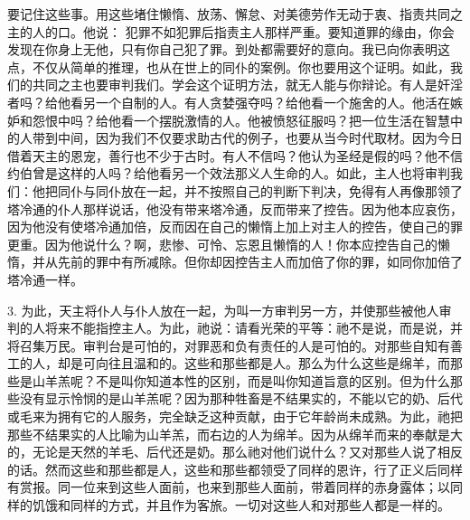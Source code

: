 要记住这些事。用这些堵住懒惰、放荡、懈怠、对美德劳作无动于衷、指责共同之主的人的口。他说： 犯罪不如犯罪后指责主人那样严重。要知道罪的缘由，你会发现在你身上无他，只有你自己犯了罪。到处都需要好的意向。我已向你表明这点，不仅从简单的推理，也从在世上的同仆的案例。你也要用这个证明。如此，我们的共同之主也要审判我们。学会这个证明方法，就无人能与你辩论。有人是奸淫者吗？给他看另一个自制的人。有人贪婪强夺吗？给他看一个施舍的人。他活在嫉妒和怨恨中吗？给他看一个摆脱激情的人。他被愤怒征服吗？把一位生活在智慧中的人带到中间，因为我们不仅要求助古代的例子，也要从当今时代取材。因为今日借着天主的恩宠，善行也不少于古时。有人不信吗？他认为圣经是假的吗？他不信约伯曾是这样的人吗？给他看另一个效法那义人生命的人。如此，主人也将审判我们：他把同仆与同仆放在一起，并不按照自己的判断下判决，免得有人再像那领了塔冷通的仆人那样说话，他没有带来塔冷通，反而带来了控告。因为他本应哀伤，因为他没有使塔冷通加倍，反而因在自己的懒惰上加上对主人的控告，使自己的罪更重。因为他说什么？啊，悲惨、可怜、忘恩且懒惰的人！你本应控告自己的懒惰，并从先前的罪中有所减除。但你却因控告主人而加倍了你的罪，如同你加倍了塔冷通一样。\par

3. 为此，天主将仆人与仆人放在一起，为叫一方审判另一方，并使那些被他人审判的人将来不能指控主人。为此，祂说：请看光荣的平等：祂不是说，而是说，并将召集万民。审判台是可怕的，对罪恶和负有责任的人是可怕的。对那些自知有善工的人，却是可向往且温和的。这些和那些都是人。那么为什么这些是绵羊，而那些是山羊羔呢？不是叫你知道本性的区别，而是叫你知道旨意的区别。但为什么那些没有显示怜悯的是山羊羔呢？因为那种牲畜是不结果实的，不能以它的奶、后代或毛来为拥有它的人服务，完全缺乏这种贡献，由于它年龄尚未成熟。为此，祂把那些不结果实的人比喻为山羊羔，而右边的人为绵羊。因为从绵羊而来的奉献是大的，无论是天然的羊毛、后代还是奶。那么祂对他们说什么？又对那些人说了相反的话。然而这些和那些都是人，这些和那些都领受了同样的恩许，行了正义后同样有赏报。同一位来到这些人面前，也来到那些人面前，带着同样的赤身露体；以同样的饥饿和同样的方式，并且作为客旅。一切对这些人和对那些人都是一样的。\par

